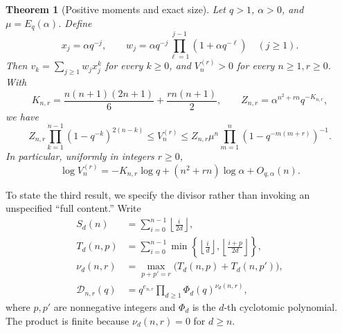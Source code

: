 \documentclass[11pt]{article}
\numberwithin{equation}{section}
\newtheorem{theorem}{Theorem}[section]
\theoremstyle{definition}
\theoremstyle{remark}
\newcommand{\DD}{\mathcal{D}}
\newcommand{\fl}[1]{\left\lfloor#1\right\rfloor}
\begin{document}
\begin{theorem}[Positive moments and exact size]\label{thm:main-positive}
Let $q>1$, $\alpha>0$, and $\mu=E_q(\alpha)$. Define
\begin{equation}\label{eq:positive-nodes}
 x_j=\alpha q^{-j},\qquad
 w_j=\alpha q^{-j}\prod_{\ell=1}^{j-1}(1+\alpha q^{-\ell})
 \quad(j\ge1).
\end{equation}
Then $v_k=\sum_{j\ge1}w_jx_j^k$ for every $k\ge0$, and
$V_n^{(r)}>0$ for every $n\ge1,r\ge0$. With
\begin{equation}\label{eq:KZ}
 K_{n,r}=\frac{n(n+1)(2n+1)}6+\frac{rn(n+1)}2,
 \qquad Z_{n,r}=\alpha^{n^2+rn}q^{-K_{n,r}},
\end{equation}
we have
\begin{equation}\label{eq:main-bounds}
 Z_{n,r}\prod_{k=1}^{n-1}(1-q^{-k})^{2(n-k)}
 \le V_n^{(r)}
 \le Z_{n,r}\mu^n\prod_{m=1}^n(1-q^{-m(m+r)})^{-1}.
\end{equation}
In particular, uniformly in integers $r\ge0$,
\begin{equation}\label{eq:log-asymptotic}
 \log V_n^{(r)}=-K_{n,r}\log q+(n^2+rn)\log\alpha+O_{q,\alpha}(n).
\end{equation}
\end{theorem}

To state the third result, we specify the divisor rather than invoking an
unspecified ``full content.'' Write
\begin{align}
 S_d(n)&=\sum_{i=0}^{n-1}\fl{\frac{i}{2d}},\label{eq:S}\\
 T_d(n,p)&=\sum_{i=0}^{n-1}
 \min\left\{\fl{\frac{i}{d}},\fl{\frac{i+p}{2d}}\right\},\label{eq:T}\\
 \nu_d(n,r)&=\max_{p+p'=r}\bigl(T_d(n,p)+T_d(n,p')\bigr),\label{eq:nu}\\
 \DD_{n,r}(q)&=q^{e_{n,r}}\prod_{d\ge1}\Phi_d(q)^{\nu_d(n,r)},\label{eq:divisor}
\end{align}
where $p,p'$ are nonnegative integers and $\Phi_d$ is the $d$-th
cyclotomic polynomial. The product is finite because $\nu_d(n,r)=0$
for $d\ge n$.
\end{document}
